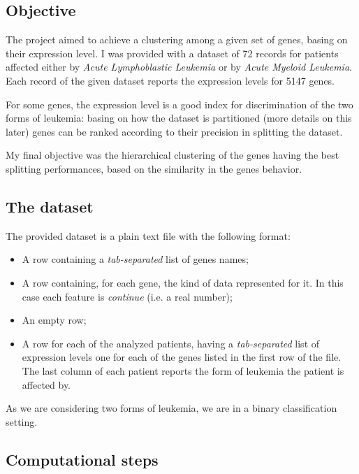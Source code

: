 \subsection{ Objective }

    The project aimed to achieve a clustering among a given set of genes,
    basing on their expression level. I was provided with a dataset of 72
    records for patients affected either by \emph{Acute Lymphoblastic
    Leukemia} or by \emph{Acute Myeloid Leukemia}. Each record of the
    given dataset reports the expression levels for 5147 genes.

    For some genes, the expression level is a good index for
    discrimination of the two forms of leukemia: basing on how the dataset
    is partitioned (more details on this later) genes can be ranked
    according to their precision in splitting the dataset.

    My final objective was the hierarchical clustering of the genes having
    the best splitting performances, based on the similarity in the genes
    behavior.

\subsection{ The dataset }

    The provided dataset is a plain text file with the following format:
    \begin{itemize}
    \item   A row containing a \emph{tab-separated} list of genes names;
    \item   A row containing, for each gene, the kind of data represented
            for it. In this case each feature is \emph{continue} (i.e. a
            real number);
    \item   An empty row;
    \item   A row for each of the analyzed patients,
            having a \emph{tab-separated} list of expression levels one
            for each of the genes listed in the first row of the
            file. The last column of each patient reports the form of
            leukemia the patient is affected by.
    \end{itemize}

    As we are considering two forms of leukemia, we are in a binary
    classification setting.

\subsection{ Computational steps } \label{sub:Computational-steps}

